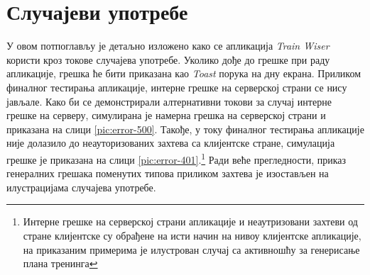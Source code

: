 \documentclass[12pt,oneside]{memoir}
\begin{document}
\section{Случајеви употребе}


У овом потпоглављу је детаљно изложено како се апликација \textit{Train Wiser} користи кроз токове случајева употребе. Уколико дође до грешке при раду апликације, грешка ће бити приказана као \textit{Toast} порука на дну екрана. Приликом финалног тестирања апликације, интерне грешке на серверској страни се нису јављале. Како би се демонстрирали алтернативни токови за случај интерне грешке на серверу, симулирана је намерна грешка на серверској страни и приказана на слици \ref{pic:error-500}. Такође, у току финалног тестирања апликације није долазило до неауторизованих захтева са клијентске стране, симулација грешке је приказана на слици \ref{pic:error-401}.\footnote{Интерне грешке на серверској страни апликације и неаутризовани захтеви од стране клијентске су обрађене на исти начин на нивоу клијентске апликације, на приказаним примерима је илустрован случај са активношћу за генерисање плана тренинга} Ради веће прегледности, приказ генералних грешака поменутих типова приликом захтева је изостављен на илустрацијама случајева употребе.
\end{document}
